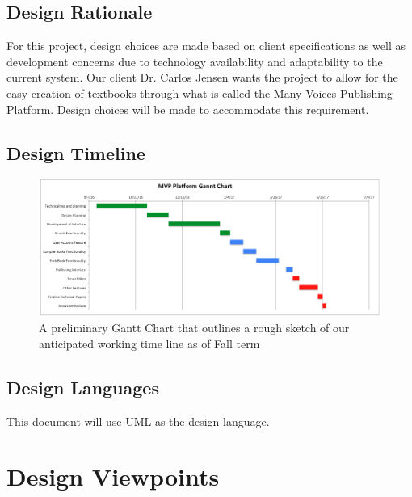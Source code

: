 \documentclass[letterpaper, 10pt, draftclsnofoot, compsoc, onecolumn]{IEEEtran}
\begin{document}

\subsection{Design Rationale}
{\noindent For this project, design choices are made based on client specifications as well as development concerns 
due to technology availability and adaptability to the current system. 
Our client Dr. Carlos Jensen wants the project to allow for the easy creation of 
textbooks through what is called the Many Voices Publishing Platform. 
Design choices will be made to accommodate this requirement.\par}

\subsection{Design Timeline}
\begin{figure}[ht!]
\centering
\includegraphics[width=160mm]{gantt_chart.png}
\caption{A preliminary Gantt Chart that outlines a rough sketch of our anticipated working time line as of Fall term}
\end{figure}

\subsection{Design Languages}
{\noindent This document will use UML as the design language.\par}





\clearpage
\section{Design Viewpoints}
\end{document}
